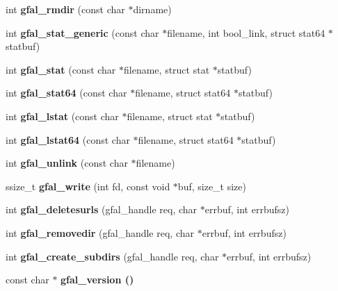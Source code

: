 \begin{CompactItemize}
\item 
int \textbf{gfal\_\-rmdir} (const char $\ast$dirname)\label{group__posix__group_gcc4b6347640a722674c2d6df437490df}

\item 
int \textbf{gfal\_\-stat\_\-generic} (const char $\ast$filename, int bool\_\-link, struct stat64 $\ast$statbuf)\label{gfal__posix_8c_678840d435b1b1a34645fa21d34e1102}

\item 
int \textbf{gfal\_\-stat} (const char $\ast$filename, struct stat $\ast$statbuf)\label{group__posix__group_g1d8c86d522d5dd26ee7ddcd9c6925964}

\item 
int \textbf{gfal\_\-stat64} (const char $\ast$filename, struct stat64 $\ast$statbuf)\label{group__posix__group_gb40e2d23618763284ab4a1fb1a06a880}

\item 
int \textbf{gfal\_\-lstat} (const char $\ast$filename, struct stat $\ast$statbuf)\label{group__posix__group_g347f867802a33bc04fdfb769da857103}

\item 
int \textbf{gfal\_\-lstat64} (const char $\ast$filename, struct stat64 $\ast$statbuf)\label{group__posix__group_g739ca4985a67e0fc4fc253f42df2638c}

\item 
int \textbf{gfal\_\-unlink} (const char $\ast$filename)\label{group__posix__group_gdeb4c6cc47f507da3e3b498374e308fb}

\item 
ssize\_\-t \textbf{gfal\_\-write} (int fd, const void $\ast$buf, size\_\-t size)\label{group__posix__group_g00c2d64894ae81c05846b06c84727ae9}

\item 
int \textbf{gfal\_\-deletesurls} (gfal\_\-handle req, char $\ast$errbuf, int errbufsz)\label{gfal__posix_8c_72e48640200202bb9e9cf47e8a71f942}

\item 
int \textbf{gfal\_\-removedir} (gfal\_\-handle req, char $\ast$errbuf, int errbufsz)\label{gfal__posix_8c_8482ace6bde89a99f66d52bb66e012d9}

\item 
int \textbf{gfal\_\-create\_\-subdirs} (gfal\_\-handle req, char $\ast$errbuf, int errbufsz)\label{gfal__posix_8c_2a4f0aab963f1f1006953333907ecdbb}

\item 
const char $\ast$ \bf{gfal\_\-version} ()\label{group__common__group_ga5a8df616e6a5e6fc1d94e2374c7ccf2}


\end{CompactItemize}
